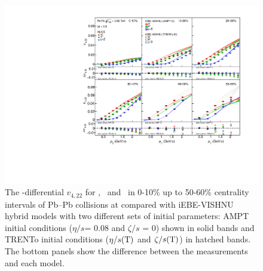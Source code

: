 \documentclass[ALICE,manyauthors]{cernphprep}
\begin{document}
 \begin{figure}[h]
\begin{center}
\includegraphics[scale=0.73]{figures/model/TrentoAndAMPT_v422_gap00_PID2.pdf}
\end{center}
\caption{The \pT-differential $v_{4,22}$ for \pion, \kaon~and \proton~in 0-10\% up to 50-60\% centrality intervals of Pb--Pb collisions at \sNN compared with iEBE-VISHNU hybrid models with two different sets of initial parameters: AMPT initial conditions ($\eta/s$= 0.08 and $\zeta/s$ = 0) shown in solid bands and TRENTo initial conditions ($\eta/s({\rm T})$ and $\zeta/s({\rm T})$) in hatched bands. The bottom panels show the difference between the measurements and each model.}
\label{v422_model}
\end{figure}
\end{document}
